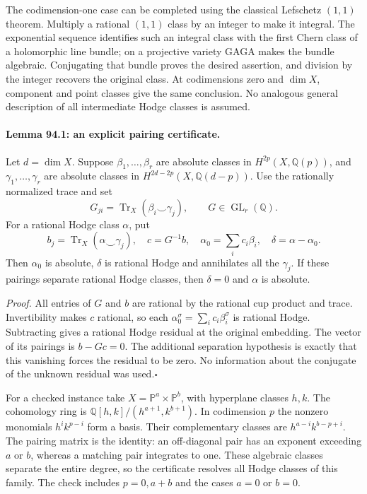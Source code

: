 \documentclass[11pt]{article}
\begin{document}
The codimension-one case can be completed using the classical Lefschetz
$(1,1)$ theorem. Multiply a rational $(1,1)$ class by an integer to make
it integral. The exponential sequence identifies such an integral class
with the first Chern class of a holomorphic line bundle; on a projective
variety GAGA makes the bundle algebraic. Conjugating that bundle proves
the desired assertion, and division by the integer recovers the
original class. At codimensions zero and $\dim X$, component and point
classes give the same conclusion. No analogous general description of
all intermediate Hodge classes is assumed.

\paragraph{Lemma 94.1: an explicit pairing certificate.}
Let $d=\dim X$. Suppose $\beta_1,\ldots,\beta_r$ are absolute classes in
$H^{2p}(X,\mathbb Q(p))$, and $\gamma_1,\ldots,\gamma_r$ are absolute
classes in $H^{2d-2p}(X,\mathbb Q(d-p))$. Use the rationally normalized
trace and set
\[
 G_{ji}=\operatorname{Tr}_X(\beta_i\smile\gamma_j),\qquad
                         G\in\operatorname{GL}_r(\mathbb Q).
\]
For a rational Hodge class $\alpha$, put
\[
 b_j=\operatorname{Tr}_X(\alpha\smile\gamma_j),\quad
 c=G^{-1}b,\quad
 \alpha_0=\sum_i c_i\beta_i,\quad \delta=\alpha-\alpha_0.
\]
Then $\alpha_0$ is absolute, $\delta$ is rational Hodge and annihilates
all the $\gamma_j$. If these pairings separate rational Hodge classes,
then $\delta=0$ and $\alpha$ is absolute.

\emph{Proof.} All entries of $G$ and $b$ are rational by the rational
cup product and trace. Invertibility makes $c$ rational, so each
$\alpha_0^\sigma=\sum_i c_i\beta_i^\sigma$ is rational Hodge.
Subtracting gives a rational Hodge residual at the original embedding.
The vector of its pairings is $b-Gc=0$. The additional separation
hypothesis is exactly that this vanishing forces the residual to be
zero. No information about the conjugate of the unknown residual was
used.\hfill$\square$

For a checked instance take $X=\mathbb P^a\times\mathbb P^b$, with
hyperplane classes $h,k$. The cohomology ring is
$\mathbb Q[h,k]/(h^{a+1},k^{b+1})$. In codimension $p$ the nonzero
monomials $h^ik^{p-i}$ form a basis. Their complementary classes are
$h^{a-i}k^{b-p+i}$. The pairing matrix is the identity: an off-diagonal
pair has an exponent exceeding $a$ or $b$, whereas a matching pair
integrates to one. These algebraic classes separate the entire degree,
so the certificate resolves all Hodge classes of this family. The
check includes $p=0,a+b$ and the cases $a=0$ or $b=0$.
\end{document}
